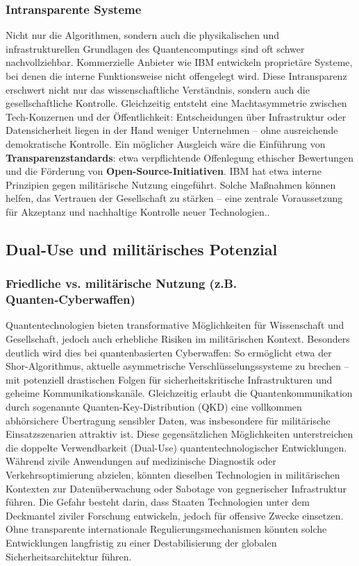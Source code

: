 \subsubsection{Intransparente Systeme }
Nicht nur die Algorithmen, sondern auch die physikalischen und infrastrukturellen Grundlagen des Quantencomputings sind oft schwer nachvollziehbar. Kommerzielle Anbieter wie IBM entwickeln proprietäre Systeme, bei denen die interne Funktionsweise nicht offengelegt wird. Diese Intransparenz erschwert nicht nur das wissenschaftliche Verständnis, sondern auch die gesellschaftliche Kontrolle.\cite{noauthor_defining_nodate}
Gleichzeitig entsteht eine Machtasymmetrie zwischen Tech-Konzernen und der Öffentlichkeit: Entscheidungen über Infrastruktur oder Datensicherheit liegen in der Hand weniger Unternehmen – ohne ausreichende demokratische Kontrolle.\cite{noauthor_ethics_nodate}
Ein möglicher Ausgleich wäre die Einführung von \textbf{Transparenzstandards}: etwa verpflichtende Offenlegung ethischer Bewertungen und die Förderung von \textbf{Open-Source-Initiativen}. IBM hat etwa interne Prinzipien gegen militärische Nutzung eingeführt.\cite{noauthor_defining_nodate} Solche Maßnahmen können helfen, das Vertrauen der Gesellschaft zu stärken – eine zentrale Voraussetzung für Akzeptanz und nachhaltige Kontrolle neuer Technologien.\cite{noauthor_quantum_nodate}.
 
\subsection{Dual‑Use und militärisches Potenzial}
\subsubsection{Friedliche vs. militärische Nutzung (z.B. Quanten‑Cyberwaffen)}
Quantentechnologien bieten transformative Möglichkeiten für Wissenschaft und Gesellschaft, jedoch auch erhebliche Risiken im militärischen Kontext. Besonders deutlich wird dies bei quantenbasierten Cyberwaffen: So ermöglicht etwa der Shor-Algorithmus, aktuelle asymmetrische Verschlüsselungssysteme zu brechen – mit potenziell drastischen Folgen für sicherheitskritische Infrastrukturen und geheime Kommunikationskanäle\cite{krelina_quantum_2021}. Gleichzeitig erlaubt die Quantenkommunikation durch sogenannte Quanten‑Key‑Distribution (QKD) eine vollkommen abhörsichere Übertragung sensibler Daten, was insbesondere für militärische Einsatzszenarien attraktiv ist\cite{neumann_quantum_2020}.
Diese gegensätzlichen Möglichkeiten unterstreichen die doppelte Verwendbarkeit (Dual-Use) quantentechnologischer Entwicklungen. Während zivile Anwendungen auf medizinische Diagnostik oder Verkehrsoptimierung abzielen, könnten dieselben Technologien in militärischen Kontexten zur Datenüberwachung oder Sabotage von gegnerischer Infrastruktur führen. Die Gefahr besteht darin, dass Staaten Technologien unter dem Deckmantel ziviler Forschung entwickeln, jedoch für offensive Zwecke einsetzen. Ohne transparente internationale Regulierungsmechanismen könnten solche Entwicklungen langfristig zu einer Destabilisierung der globalen Sicherheitsarchitektur führen.

